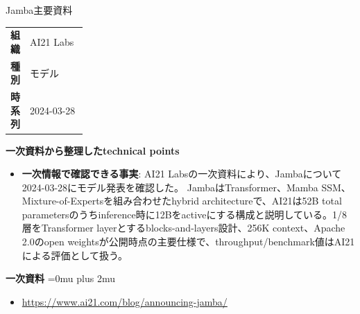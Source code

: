 \begin{technicalnote}{Jamba}{主要資料}
\begingroup
\begin{tabularx}{\linewidth}{@{}>{\bfseries}p{0.22\linewidth}X@{}}
組織 & AI21 Labs \\
種別 & モデル \\
時系列 & 2024-03-28 \\
\end{tabularx}
\smallskip
\begin{minipage}{\linewidth}
{\bfseries 一次資料から整理したtechnical points}
\begin{itemize}[leftmargin=1.5em,itemsep=0.35em]
\item \textbf{一次情報で確認できる事実}: AI21 Labsの一次資料により、Jambaについて2024-03-28にモデル発表を確認した。 JambaはTransformer、Mamba SSM、Mixture-of-Expertsを組み合わせたhybrid architectureで、AI21は52B total parametersのうちinference時に12Bをactiveにする構成と説明している。1/8層をTransformer layerとするblocks-and-layers設計、256K context、Apache 2.0のopen weightsが公開時点の主要仕様で、throughput/benchmark値はAI21による評価として扱う。
\end{itemize}
\begin{minipage}{\linewidth}
\begin{samepage}
{\bfseries 一次資料}
\begingroup\sloppy
\Urlmuskip=0mu plus 2mu\relax
\begin{itemize}[leftmargin=1.5em,itemsep=0.25em]
\item {\scriptsize\url{https://www.ai21.com/blog/announcing-jamba/}}
\end{itemize}
\endgroup
\end{samepage}
\end{minipage}
\end{minipage}
\endgroup
\end{technicalnote}
\medskip

